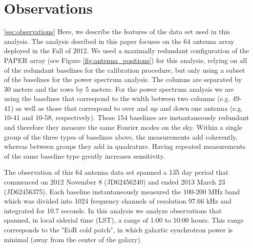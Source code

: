 \documentclass[twocolumn,numberedappendix]{emulateapj}
\begin{document}
\section{Observations}\ref{sec:observations}
Here, we describe the features of the data set used in this analysis. 
The analysis desribed in this paper focuses on the 64 antenna array deployed in
the Fall of 2012.  We used a maximally redundant configuration of the PAPER
array (see Figure \ref{fig:antenna_positions}) for this analysis, relying on all
of the redundant baselines for the calibration procedure, but only using a
subset of the baselines for the power spectrum analysis. The columns are
separated by 30 meters and the rows by 5 meters. For the power spectrum analysis
we are using the baselines that correspond to the width between two columns
(e.g.  49-41) as well as those that correspond to over and up and down one
antenna (e.g. 10-41 and 10-58, respectively). These 154 baselines are
instantaneously redundant and therefore they measure the same Fourier modes on
the sky. Within a single group of the three types of baselines above, the
measurements add coherently, whereas between groups they add in quadrature.
Having repeated measurements of the same baseline type greatly increases
sensitivity. 

The observation of this 64 antenna data set spanned a 135 day period that
commenced on 2012 November 8 (JD62456240) and ended  2013 March 23 (JD62456375). 
Each baseline instantaneously measured the 100-200 MHz band which was divided
into 1024 frequency channels of resolution 97.66 kHz and integrated for 10.7
seconds. In this analysis we analyze observations that spanned, in local
siderial time (LST), a range of 1:00 to 10:00 hours. This range corresponds to
the "EoR cold patch", in which galaxtic synchrotron power is minimal (away from
the center of the galaxy).
\end{document}
